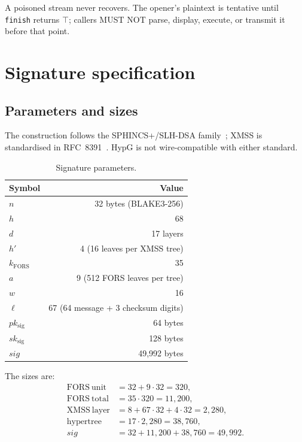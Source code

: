 \documentclass[11pt,a4paper]{article}
\theoremstyle{plain}
\theoremstyle{definition}
\theoremstyle{remark}
\begin{document}
A poisoned stream never recovers.  The opener's plaintext is tentative
until \texttt{finish} returns $\top$; callers MUST NOT parse, display,
execute, or transmit it before that point.

\section{Signature specification}
\label{sec:ds}

\subsection{Parameters and sizes}

The construction follows the SPHINCS+/SLH-DSA family~\cite{sphincs,fips205};
XMSS is standardised in RFC~8391~\cite{rfc8391}.  HypG is not
wire-compatible with either standard.

\begin{table}[t]
\centering
\small
\begin{tabular}{@{}lr@{}}
\toprule
Symbol & Value \\
\midrule
$n$ & 32 bytes (BLAKE3-256) \\
$h$ & 68 \\
$d$ & 17 layers \\
$h'$ & 4 (16 leaves per XMSS tree) \\
$k_{\mathrm{FORS}}$ & 35 \\
$a$ & 9 (512 FORS leaves per tree) \\
$w$ & 16 \\
$\ell$ & 67 (64 message + 3 checksum digits) \\
$pk_{\mathrm{sig}}$ & 64 bytes \\
$sk_{\mathrm{sig}}$ & 128 bytes \\
$\mathit{sig}$ & 49,992 bytes \\
\bottomrule
\end{tabular}
\caption{Signature parameters.}
\label{tab:dsparams}
\end{table}

The sizes are:
\[
\begin{aligned}
 \mathrm{FORS\ unit} &= 32+9\cdot32=320,\\
 \mathrm{FORS\ total} &= 35\cdot320=11{,}200,\\
 \mathrm{XMSS\ layer} &= 8+67\cdot32+4\cdot32=2{,}280,\\
 \mathrm{hypertree} &= 17\cdot2{,}280=38{,}760,\\
 \mathit{sig} &= 32+11{,}200+38{,}760=49{,}992.
\end{aligned}
\]
\end{document}
